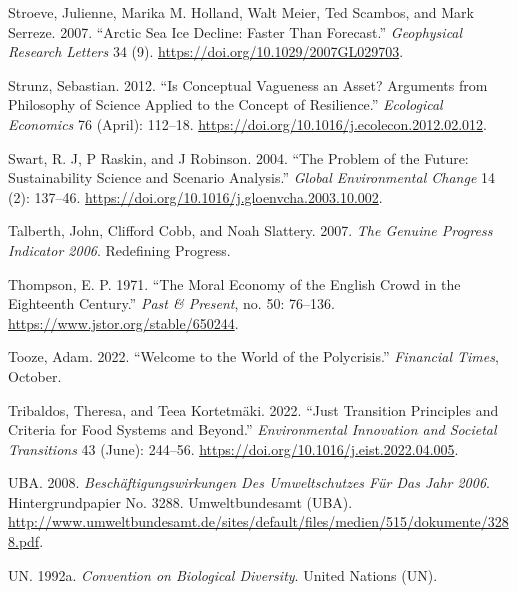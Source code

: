 \documentclass[
  a4paper,
  DIV=11,
  numbers=noendperiod,
  oneside,
  openany]{scrreprt}
\newlength{\cslhangindent}
\newenvironment{CSLReferences}[2] %
 {\begin{list}{}{%
  \setlength{\itemindent}{0pt}
  \setlength{\leftmargin}{0pt}
  \setlength{\parsep}{0pt}
  \ifodd #1
   \setlength{\leftmargin}{\cslhangindent}
   \setlength{\itemindent}{-1\cslhangindent}
  \fi
  \setlength{\itemsep}{#2\baselineskip}}}
 {\end{list}}
\begin{document}
\begin{CSLReferences}{1}{1}
Stroeve, Julienne, Marika M. Holland, Walt Meier, Ted Scambos, and Mark
Serreze. 2007. {``Arctic Sea Ice Decline: {Faster} Than Forecast.''}
\emph{Geophysical Research Letters} 34 (9).
\url{https://doi.org/10.1029/2007GL029703}.

Strunz, Sebastian. 2012. {``Is Conceptual Vagueness an Asset?
{Arguments} from Philosophy of Science Applied to the Concept of
Resilience.''} \emph{Ecological Economics} 76 (April): 112--18.
\url{https://doi.org/10.1016/j.ecolecon.2012.02.012}.

Swart, R. J, P Raskin, and J Robinson. 2004. {``The Problem of the
Future: Sustainability Science and Scenario Analysis.''} \emph{Global
Environmental Change} 14 (2): 137--46.
\url{https://doi.org/10.1016/j.gloenvcha.2003.10.002}.

Talberth, John, Clifford Cobb, and Noah Slattery. 2007. \emph{The
{Genuine Progress Indicator} 2006}. Redefining Progress.

Thompson, E. P. 1971. {``The {Moral Economy} of the {English Crowd} in
the {Eighteenth Century}.''} \emph{Past \& Present}, no. 50: 76--136.
\url{https://www.jstor.org/stable/650244}.

Tooze, Adam. 2022. {``Welcome to the World of the Polycrisis.''}
\emph{Financial Times}, October.

Tribaldos, Theresa, and Teea Kortetmäki. 2022. {``Just Transition
Principles and Criteria for Food Systems and Beyond.''}
\emph{Environmental Innovation and Societal Transitions} 43 (June):
244--56. \url{https://doi.org/10.1016/j.eist.2022.04.005}.

UBA. 2008. \emph{Beschäftigungswirkungen Des {Umweltschutzes} Für Das
{Jahr} 2006}. Hintergrundpapier No. 3288. Umweltbundesamt (UBA).
\url{http://www.umweltbundesamt.de/sites/default/files/medien/515/dokumente/3288.pdf}.

UN. 1992a. \emph{Convention on {Biological Diversity}}. United Nations
(UN).


\end{CSLReferences}
\end{document}
